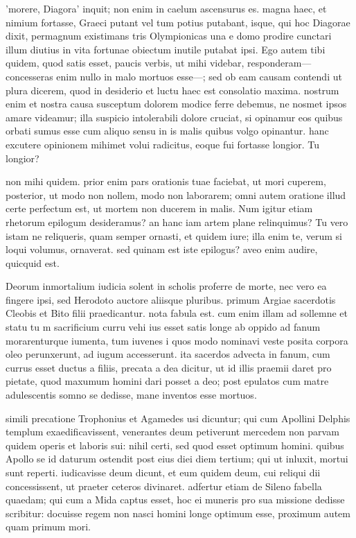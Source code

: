  'morere, Diagora' inquit; non enim in caelum ascensurus es. magna haec, et nimium fortasse, Graeci putant vel tum potius putabant, isque, qui hoc Diagorae dixit, permagnum existimans tris Olympionicas una e domo prodire cunctari illum diutius in vita fortunae obiectum inutile putabat ipsi. Ego autem tibi quidem, quod satis esset, paucis verbis, ut mihi videbar, responderam—concesseras enim nullo in malo mortuos esse—; sed ob eam causam contendi ut plura dicerem, quod in desiderio et luctu haec est consolatio maxima. nostrum enim et nostra causa susceptum dolorem modice ferre debemus, ne nosmet ipsos amare videamur; illa suspicio intolerabili dolore cruciat, si opinamur eos quibus orbati sumus esse cum aliquo sensu in is malis quibus volgo opinantur. hanc excutere opinionem mihimet volui radicitus, eoque fui fortasse longior. Tu longior?

 non mihi quidem. prior enim pars orationis tuae faciebat, ut mori cuperem, posterior, ut modo non nollem, modo non laborarem; omni autem oratione illud certe perfectum est, ut mortem non ducerem in malis. Num igitur etiam rhetorum epilogum desideramus? an hanc iam artem plane relinquimus? Tu vero istam ne reliqueris, quam semper ornasti, et quidem iure; illa enim te, verum si loqui volumus, ornaverat. sed quinam est iste epilogus? aveo enim audire, quicquid est.

 Deorum inmortalium iudicia solent in scholis proferre de morte, nec vero ea fingere ipsi, sed Herodoto auctore aliisque pluribus. primum Argiae sacerdotis Cleobis et Bito filii praedicantur. nota fabula est. cum enim illam ad sollemne et statu tu m sacrificium curru vehi ius esset satis longe ab oppido ad fanum morarenturque iumenta, tum iuvenes i quos modo nominavi veste posita corpora oleo perunxerunt, ad iugum accesserunt. ita sacerdos advecta in fanum, cum currus esset ductus a filiis, precata a dea dicitur, ut id illis praemii daret pro pietate, quod maxumum homini dari posset a deo; post epulatos cum matre adulescentis somno se dedisse, mane inventos esse mortuos.

 simili precatione Trophonius et Agamedes usi dicuntur; qui cum Apollini Delphis templum exaedificavissent, venerantes deum petiverunt mercedem non parvam quidem operis et laboris sui: nihil certi, sed quod esset optimum homini. quibus Apollo se id daturum ostendit post eius diei diem tertium; qui ut inluxit, mortui sunt reperti. iudicavisse deum dicunt, et eum quidem deum, cui reliqui dii concessissent, ut praeter ceteros divinaret. adfertur etiam de Sileno fabella quaedam; qui cum a Mida captus esset, hoc ei muneris pro sua missione dedisse scribitur: docuisse regem non nasci homini longe optimum esse, proximum autem quam primum mori.

